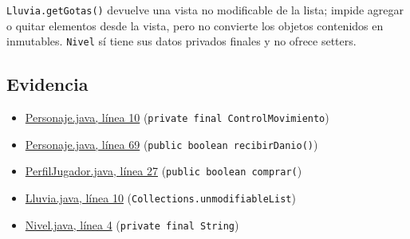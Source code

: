 \texttt{Lluvia.getGotas()} devuelve una vista no modificable de la lista; impide agregar o quitar elementos desde la vista, pero no convierte los objetos contenidos en inmutables. \texttt{Nivel} sí tiene sus datos privados finales y no ofrece setters.

\subsection*{Evidencia}
\begin{itemize}
\item \href{https://github.com/maverick1006/Proyecto-Game-LLuvia-/blob/entrega-final/core/src/main/java/puppy/code/Personaje.java#L10}{Personaje.java, línea 10} (\texttt{private final ControlMovimiento})
\item \href{https://github.com/maverick1006/Proyecto-Game-LLuvia-/blob/entrega-final/core/src/main/java/puppy/code/Personaje.java#L69}{Personaje.java, línea 69} (\texttt{public boolean recibirDanio()})
\item \href{https://github.com/maverick1006/Proyecto-Game-LLuvia-/blob/entrega-final/core/src/main/java/puppy/code/PerfilJugador.java#L27}{PerfilJugador.java, línea 27} (\texttt{public boolean comprar(})
\item \href{https://github.com/maverick1006/Proyecto-Game-LLuvia-/blob/entrega-final/core/src/main/java/puppy/code/Lluvia.java#L10}{Lluvia.java, línea 10} (\texttt{Collections.unmodifiableList})
\item \href{https://github.com/maverick1006/Proyecto-Game-LLuvia-/blob/entrega-final/core/src/main/java/puppy/code/Nivel.java#L4}{Nivel.java, línea 4} (\texttt{private final String})
\end{itemize}


